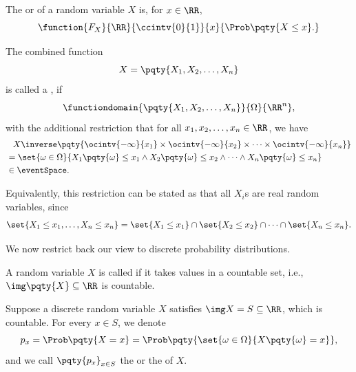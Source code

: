 \begin{definition}
    \label{def:probability-distribution-function}%
    The  or  of a random variable \(X\) is, for \(x \in \RR\),
    \[
        \function{F_X}{\RR}{\ccintv{0}{1}}{x}{\Prob\pqty{X \leq x}.}
    \]
\end{definition}

\begin{definition}
    \label{def:random-variable-rn}%
    The combined function
    \[
        X = \pqty{X_1, X_2, \ldots, X_n}
    \]
    is called a , if
    \[
        \functiondomain{\pqty{X_1, X_2, \ldots, X_n}}{\Omega}{\RR^n},
    \]
    with the additional restriction that for all \(x_1, x_2, \ldots, x_n \in \RR\), we have
    \begin{align*}
        &\phantom{=} X\inverse\pqty{\ocintv{-\infty}{x_1} \times \ocintv{-\infty}{x_2} \times \cdots \times \ocintv{-\infty}{x_n}} \\
        &= \set{\omega \in \Omega}{X_1 \pqty{\omega} \leq x_1 \land X_2 \pqty{\omega} \leq x_2 \land \cdots \land X_n \pqty{\omega} \leq x_n} \\
        &\in \eventSpace.
    \end{align*}

    Equivalently, this restriction can be stated as that all \(X_i\)s are real random variables, since
    \[
        \set{X_1 \leq x_1, \ldots, X_n \leq x_n} = \set{X_1 \leq x_1} \cap \set{X_2 \leq x_2} \cap \cdots \cap \set{X_n \leq x_n}.
    \]
\end{definition}

We now restrict back our view to discrete probability distributions.

\begin{definition}
    \label{def:discrete-random-variable}%
    A random variable \(X\) is called  if it takes values in a countable set, i.e., \(\img \pqty{X} \subseteq \RR\) is countable.
\end{definition}

\begin{definition}
    \label{def:probability-mass-function}%
    Suppose a discrete random variable \(X\) satisfies \(\img X = S \subseteq \RR\), which is countable. For every \(x \in S\), we denote
    \[
        p_x = \Prob\pqty{X = x} = \Prob\pqty{\set{\omega \in \Omega}{X\pqty{\omega} = x}},
    \]
    and we call \(\pqty{p_x}_{x \in S}\) the  or the  of \(X\).
\end{definition}

